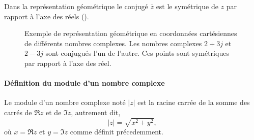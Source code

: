 Dans la représentation géométrique le conjugé $\bar{z}$ est le symétrique 
de $z$ par rapport à l'axe des réels ().


\begin{figure}[!h]
\captionsetup{width=0.8\linewidth}
\begin{center}
\end{center}
    \caption{Exemple de représentation géométrique en coordonnées cartésiennes 
             de différents nombres complexes. Les nombres complexes $2+3j$ et 
             $2-3j$ sont conjugués l'un de l'autre. Ces points sont symétriques
             par rapport à l'axe des réel.
             \label{fig-plan_complexe}}
\end{figure}

\paragraph{Définition du module d'un nombre complexe}
Le module d'un nombre complexe noté $|z|$ est la 
racine carrée de la somme des carrés de $\Re{z}$ et de $\Im{z}$, 
autrement dit, 
$$
|z|=\sqrt{x^2+y^2},
$$
où $x=\Re{z}$ et $y=\Im{z}$ comme définit précedemment.

